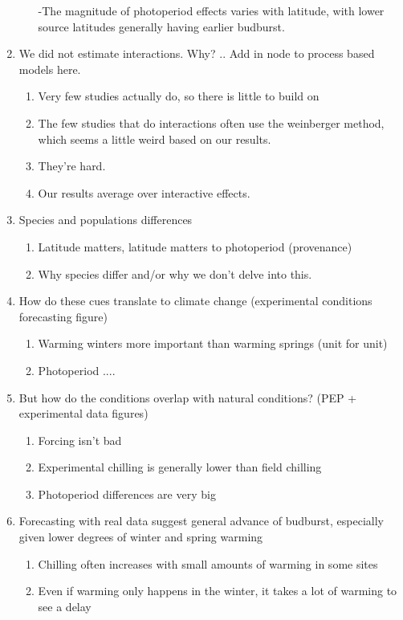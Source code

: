 \documentclass[11pt,letter]{article}
\begin{document}
\begin{enumerate}
\begin{enumerate}
-The magnitude of photoperiod effects varies with latitude, with lower source latitudes generally having earlier budburst.
\end{enumerate}
\item We did not estimate interactions. Why? ..  Add in node to process based models here. 
\begin{enumerate}
\item Very few studies actually do, so there is little to build on
\item The few studies that do interactions often use the weinberger method, which seems a little weird based on our results.
\item They're hard.
\item Our results average over interactive effects. 
\end{enumerate}
\item Species and populations differences 
\begin{enumerate}
\item Latitude matters, latitude matters to photoperiod (provenance)
\item Why species differ and/or why we don't delve into this. 
\end{enumerate}
\item How do these cues translate to climate change (experimental conditions forecasting figure)
\begin{enumerate}
\item Warming winters more important than warming springs (unit for unit)
\item Photoperiod ....
\end{enumerate}
\item But how do the conditions overlap with natural conditions? (PEP + experimental data figures)
\begin{enumerate}
\item Forcing isn't bad
\item Experimental chilling is generally lower than field chilling
\item Photoperiod differences are very big
\end{enumerate}
\item Forecasting with real data suggest general advance of budburst, especially given lower degrees of winter and spring warming
\begin{enumerate}
\item Chilling often increases with small amounts of warming in some sites
\item Even if warming only happens in the winter, it takes a lot of warming to see a delay 

\end{enumerate}
\end{enumerate}
\end{document}
